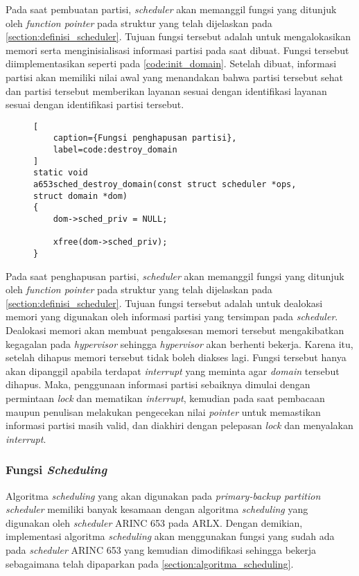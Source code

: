 Pada saat pembuatan partisi, \textit{scheduler} akan memanggil fungsi yang ditunjuk oleh
\textit{function pointer}  pada struktur yang telah dijelaskan pada
\autoref{section:definisi_scheduler}. Tujuan fungsi tersebut adalah untuk mengalokasikan memori
serta menginisialisasi informasi partisi pada saat dibuat. Fungsi tersebut diimplementasikan
seperti pada \autoref{code:init_domain}. Setelah dibuat, informasi partisi akan memiliki nilai
awal yang menandakan bahwa partisi tersebut sehat dan partisi tersebut memberikan layanan sesuai
dengan identifikasi layanan sesuai dengan identifikasi partisi tersebut.


\begin{figure}
\begin{lstlisting}[
	caption={Fungsi penghapusan partisi},
	label=code:destroy_domain
]
static void
a653sched_destroy_domain(const struct scheduler *ops, struct domain *dom)
{
    dom->sched_priv = NULL;

    xfree(dom->sched_priv);
}
\end{lstlisting}
\end{figure}

Pada saat penghapusan partisi, \textit{scheduler} akan memanggil fungsi yang ditunjuk
oleh \textit{function pointer}  pada struktur yang telah dijelaskan pada
\autoref{section:definisi_scheduler}. Tujuan fungsi tersebut adalah untuk dealokasi memori yang
digunakan oleh informasi partisi yang tersimpan pada \textit{scheduler}. Dealokasi memori akan
membuat pengaksesan memori tersebut mengakibatkan kegagalan pada \textit{hypervisor} sehingga
\textit{hypervisor} akan berhenti bekerja. Karena itu, setelah dihapus memori tersebut tidak
boleh diakses lagi. Fungsi tersebut hanya akan dipanggil apabila terdapat \textit{interrupt}
yang meminta agar \textit{domain} tersebut dihapus. Maka, penggunaan informasi partisi sebaiknya
dimulai dengan permintaan \textit{lock} dan mematikan \textit{interrupt}, kemudian pada saat
pembacaan maupun penulisan melakukan pengecekan nilai \textit{pointer} untuk memastikan
informasi partisi masih valid, dan diakhiri dengan pelepasan \textit{lock} dan
menyalakan \textit{interrupt}.

\subsubsection{Fungsi \textit{Scheduling}}
\label{section:scheduling_impl}

Algoritma \textit{scheduling} yang akan digunakan pada \textit{primary-backup partition
scheduler} memiliki banyak kesamaan dengan algoritma \textit{scheduling} yang digunakan oleh
\textit{scheduler} ARINC 653 pada ARLX. Dengan demikian, implementasi algoritma
\textit{scheduling} akan menggunakan fungsi yang sudah ada pada \textit{scheduler} ARINC 653
yang kemudian dimodifikasi sehingga bekerja sebagaimana telah dipaparkan pada
\autoref{section:algoritma_scheduling}.


